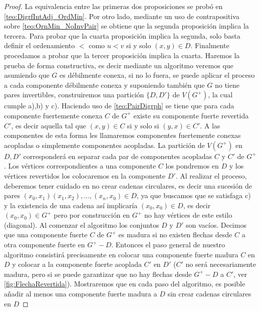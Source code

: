 \begin{teorema}
\begin{proof}
    La equivalencia entre las primeras dos proposiciones se probó en \cref{teo:DigrfIntAdj_OrdMin}.
    Por otro lado, mediante un uso de contrapositiva sobre \cref{teo:OrnMin_NoInvPair} se obtiene que la segunda proposición implica la tercera. 
    {\color{malva}Para probar que la cuarta proposición implica la segunda, solo basta definir el ordenamiento $<$ como $u<v$ si y solo $(x,y) \in D$. }
    Finalmente procedamos a probar que la tercer proposición implica la cuarta. Haremos la prueba de forma constructiva, es decir mediante un algoritmo veremos que asumiendo que $G$ es débilmente conexa, si no lo fuera, se puede aplicar el proceso a cada componente débilmente conexa y  suponiendo también que $G$ no tiene pares invertibles, construiremos una partición $\{D,D'\}$ de $V(G^+)$, la cual cumple a),b) y c). 
    Haciendo uso de \cref{teo:PairDigrph} se tiene que para cada componente fuertemente conexa $C$ de $G^+$ existe su componente fuerte revertida $C'$, es decir aquella tal que $(x,y)\in C $ si y solo si $(y,x)\in C'$. A las componentes de esta forma les llamaremos componentes fuertemente conexas acopladas o simplemente componentes acopladas.
    La partición de $V(G^+)$ en $D,D'$ corresponderá en separar cada par de componentes acopladas $C$ y $C'$ de $G^+$. Los vértices correspondientes a una componente $C$ los pondremos en $D$ y los vértices revertidos los colocaremos en la componente $D'$. Al realizar el proceso, deberemos tener cuidado en no crear cadenas circulares, es decir una sucesión de pares $(x_0,x_1)(x_1,x_2),\dots, (x_n,x_0)\in D$, ya que buscamos que se satisfaga c) y la existencia de una cadena así implicaría $(x_0,x_0)\in D$, es decir $(x_0,x_0)\in G^+$ pero por construcción en $G^+$ no hay vértices de este estilo (diagonal). 
    Al comenzar el algoritmo los conjuntos $D$ y $D'$ son vacíos. Decimos que una componente fuerte $C$ de $G^+$ es madura si no existen flechas desde $C$ a otra componente fuerte en $G^+ -D$. Entonces el paso general de nuestro algoritmo consistirá precisamente en colocar una componente fuerte madura $C$ en $D$ y colocar a la componente fuerte acoplada $C' $ en $D'$ ($C'$ no será necesariamente madura, pero si se puede garantizar que no hay flechas desde $G^+ -D$ a $C'$, ver \cref{fig:FlechaRevertida}). 
    Mostraremos que en cada paso del algoritmo, es posible añadir al menos una componente fuerte madura a $D$ sin crear cadenas circulares en $D$


    
 \end{proof}
        
        
        
        
 \end{teorema}